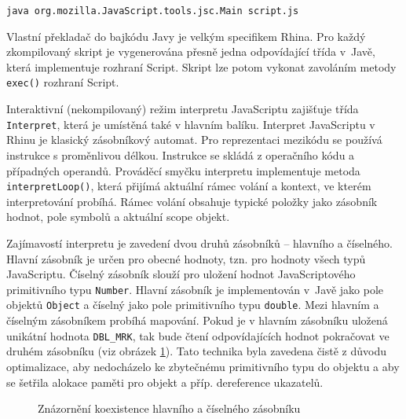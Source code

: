 \medskip
\centerline{\texttt{java org.mozilla.JavaScript.tools.jsc.Main script.js}}
\medskip

Vlastní překladač do bajkódu Javy je velkým specifikem Rhina. Pro každý zkompilovaný skript je vygenerována přesně jedna odpovídající třída v~Javě, která implementuje rozhraní Script. Skript lze potom vykonat zavoláním metody \texttt{exec()} rozhraní Script.

Interaktivní (nekompilovaný) režim interpretu JavaScriptu zajišťuje třída \texttt{Interpret}, která je umístěná také v hlavním balíku. Interpret JavaScriptu v Rhinu je klasický zásobníkový automat. Pro reprezentaci mezikódu se používá instrukce s proměnlivou délkou. Instrukce se skládá z operačního kódu a případných operandů. Prováděcí smyčku interpretu implementuje metoda \texttt{interpretLoop()}, která přijímá aktuální rámec volání a kontext, ve kterém interpretování probíhá. Rámec volání obsahuje typické položky jako zásobník hodnot, pole symbolů a aktuální scope objekt.

Zajímavostí interpretu je zavedení dvou druhů zásobníků -- hlavního a číselného. Hlavní zásobník je určen pro obecné hodnoty, tzn. pro hodnoty všech typů JavaScriptu. Číselný zásobník slouží pro uložení hodnot JavaScriptového primitivního typu \texttt{Number}. Hlavní zásobník je implementován v~Javě jako pole objektů \texttt{Object} a číselný jako pole primitivního typu \texttt{double}. Mezi hlavním a číselným zásobníkem probíhá mapování. Pokud je v hlavním zásobníku uložená unikátní hodnota \texttt{DBL\_MRK}, tak bude čtení odpovídajících hodnot pokračovat ve druhém zásobníku (viz obrázek \ref{Figure.RhinoStack}). Tato technika byla zavedena čistě z důvodu optimalizace, aby nedocházelo ke zbytečnému  primitivního typu do objektu a aby se šetřila alokace paměti pro objekt a příp. dereference ukazatelů.

\begin{figure}[H]
  \begin{center}
    \caption{Znázornění koexistence hlavního a číselného zásobníku}
    \label{Figure.RhinoStack}
  \end{center}
\end{figure}

